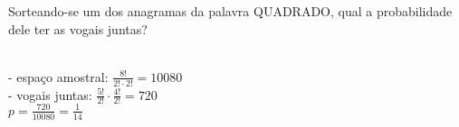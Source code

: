 \begin{ex}
 Sorteando-se um dos anagramas da palavra QUADRADO, qual a probabilidade dele ter as vogais juntas?
   \begin{sol}
     \phantom{A} \\
     - espaço amostral: $\frac{8!}{2!\cdot2!}=10080$ \\
     - vogais juntas: $\frac{5!}{2!}\cdot\frac{4!}{2!}=720$\\
     $p=\frac{720}{10080}=\frac{1}{14}$
   \end{sol}
\end{ex}